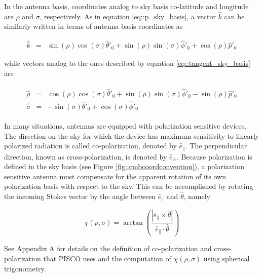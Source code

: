 \documentclass[a4paper,11pt]{article}
\newcommand{\co}{\mathbin{\|}}
\newcommand{\cx}{\mathbin{\times}}
\begin{document}
In the antenna basis, coordinates analog to sky basis co-latitude and longitude are $\rho$ and $\sigma$, respectively. As in equation \ref{eq::p_sky_basis}, a vector $\hat{k}$ can be similarly written in terms of antenna basis coordinates as

\begin{equation}
\begin{aligned}
\hat{k}       &=&  \sin(\rho)\cos(\sigma)\hat{\theta}'_0 + \sin(\rho)\sin(\sigma) \hat{\phi}'_0 + \cos(\rho) \hat{p}'_0 
\end{aligned}
\end{equation}

\noindent
while vectors analog to the ones described by equation \ref{eq::tangent_sky_basis} are

\begin{eqnarray}
\begin{aligned}
\hat{\rho}    &=&  \cos(\rho)\cos(\sigma)\hat{\theta}'_0 + \sin(\rho)\sin(\sigma) \hat{\phi}'_0 - \sin(\rho) \hat{p}'_0 \\
\hat{\sigma}  &=& -\sin(\sigma)\hat{\theta}'_0 + \cos(\sigma)\hat{\phi}'_0
\end{aligned}
\end{eqnarray}

In many situations, antennas are equipped with polarization sensitive devices. The direction on the sky for which the device has maximum sensitivity to linearly polarized radiation is called co-polarization, denoted by $\hat{e}_{\co}$. The perpendicular direction, known as cross-polarization, is denoted by $\hat{e}_{\cx}$.
Because polarization is defined in the sky basis (see Figure \ref{fig::cmbcoordconvention}), a polarization sensitive antenna must compensate for the apparent rotation of its own polarization basis with respect to the sky. This can be accomplished by rotating the incoming Stokes vector by the angle between $\hat{e}_{\co}$ and $\hat{\theta}$, namely

\begin{equation}
\chi(\rho,\sigma) = \arctan \left( \frac{ |\hat{e}_{\co} \times \hat{\theta}| }{ \hat{e}_{\co} \cdot \hat{\theta} } \right)
\label{eq::psi}
\end{equation}

See Appendix A for details on the definition of co-polarization and cross-polarization that PISCO uses and the computation of $\chi(\rho,\sigma)$ using spherical trigonometry.
\end{document}
